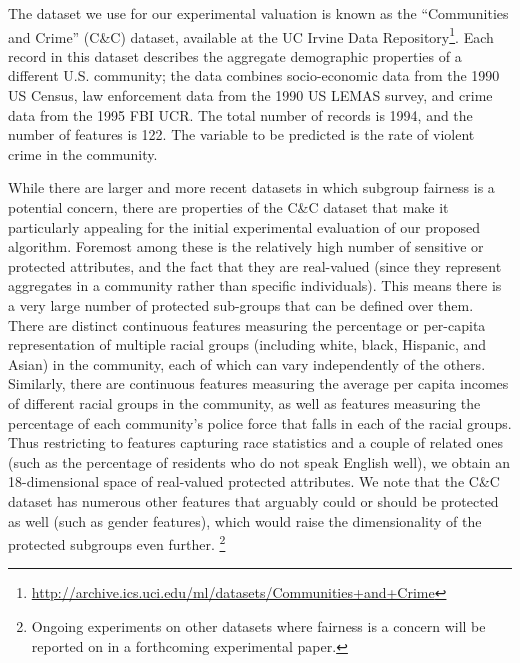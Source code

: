 
The dataset we use for our experimental valuation is known as the ``Communities and Crime'' (C\&C) dataset,
available at the UC Irvine Data Repository\footnote{\url{http://archive.ics.uci.edu/ml/datasets/Communities+and+Crime}}.
Each record in this dataset describes the aggregate demographic properties of a different U.S. community;
the data combines socio-economic data from the 1990 US Census, law enforcement data from the 1990 US LEMAS survey,
and crime data from the 1995 FBI UCR. The total number of records is 1994, and the number of features is 122.
The variable to be predicted is the rate of violent crime in the community.

While there are larger and more recent datasets in which subgroup fairness is a potential concern, there
are properties of the C\&C dataset that make it particularly appealing for the initial experimental evaluation
of our proposed algorithm. Foremost among these is the relatively high number of sensitive or protected attributes,
and the fact that they are real-valued (since they represent aggregates in a community rather than specific individuals). This means there is a very large number of protected sub-groups that can be defined over them.
There are distinct continuous features measuring the percentage or per-capita representation of multiple
racial groups (including white, black, Hispanic, and Asian) in the community, each of which can
vary independently of the others. Similarly, there are continuous features measuring the average per capita incomes
of different racial groups in the community, as well as features measuring the percentage of each community's
police force that falls in each of the racial groups. Thus restricting to features capturing race statistics and a couple of
related ones (such as the percentage of residents who do not speak English well),
we obtain an 18-dimensional space of real-valued protected attributes. We note that the C\&C dataset has numerous other
features that arguably could or should be protected as well (such as gender features),
which would raise the dimensionality of the protected
subgroups even
further. \footnote{Ongoing experiments on other datasets where fairness is
a concern will be reported on in a forthcoming experimental paper.}

